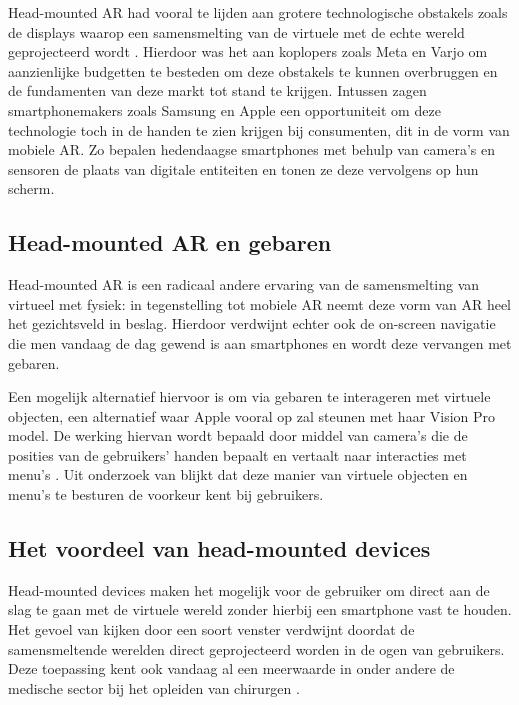 Head-mounted AR had vooral te lijden aan grotere technologische obstakels zoals de displays waarop een samensmelting van de virtuele met de echte wereld geprojecteerd wordt \autocite{YunHan2018} .
Hierdoor was het aan koplopers zoals Meta en Varjo om aanzienlijke budgetten te besteden om deze obstakels te kunnen overbruggen en de fundamenten van deze markt tot stand te krijgen. %
Intussen zagen smartphonemakers zoals Samsung en Apple een opportuniteit om deze technologie toch in de handen te zien krijgen bij consumenten, dit in de vorm van mobiele AR.
Zo bepalen hedendaagse smartphones met behulp van camera's en sensoren de plaats van digitale entiteiten en tonen ze deze vervolgens op hun scherm.

\subsection{Head-mounted AR en gebaren}
\label{subsec:ar-gestures}
Head-mounted AR is een radicaal andere ervaring van de samensmelting van virtueel met fysiek: in tegenstelling tot mobiele AR neemt deze vorm van AR heel het gezichtsveld in beslag.
Hierdoor verdwijnt echter ook de on-screen navigatie die men vandaag de dag gewend is aan smartphones en wordt deze vervangen met gebaren.

Een mogelijk alternatief hiervoor is om via gebaren te interageren met virtuele objecten, een alternatief waar Apple vooral op zal steunen met haar Vision Pro model.
De werking hiervan wordt bepaald door middel van camera's die de posities van de gebruikers' handen bepaalt en vertaalt naar interacties met menu's \textcite{Shrestha2018} .
Uit onderzoek van \textcite{Datcu2013} blijkt dat deze manier van virtuele objecten en menu's te besturen de voorkeur kent bij gebruikers.

\subsection{Het voordeel van head-mounted devices}
\label{subsec:benefits-hmd}
Head-mounted devices maken het mogelijk voor de gebruiker om direct aan de slag te gaan met de virtuele wereld zonder hierbij een smartphone vast te houden.
Het gevoel van kijken door een soort venster verdwijnt doordat de samensmeltende werelden direct geprojecteerd worden in de ogen van gebruikers.
Deze toepassing kent ook vandaag al een meerwaarde in onder andere de medische sector bij het opleiden van chirurgen \autocite{Waisberg2023} .

